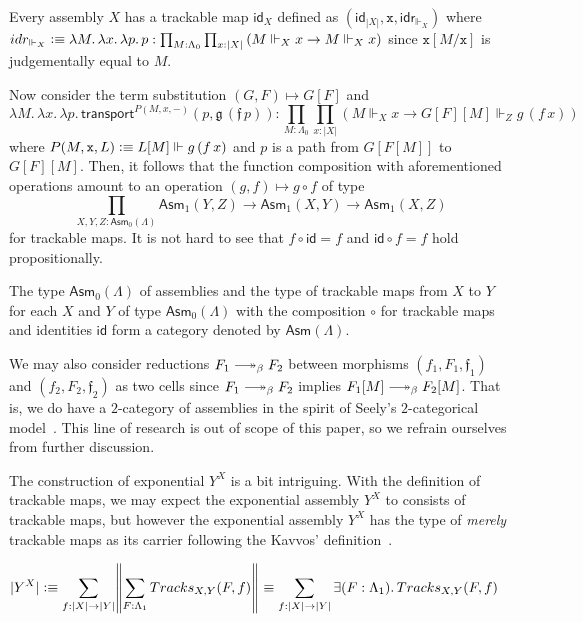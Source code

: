 \documentclass[a4paper,UKenglish,numberwithinsect,cleveref,thm-restate]{lipics-v2021}
\newcommand{\trunc}[2]{\mathopen{}\left\Vert #2\right\Vert_{#1}\mathclose{}}
\newcommand{\brck}[1]{\trunc{}{#1}}
\newcommand{\Asm}{\mathsf{Asm}}
\newcommand{\defeq}{\vcentcolon\equiv}
\newcommand{\blank}{{-}}
\newcommand{\id}{\mathsf{id}}
\DeclareRobustCommand\longtwoheadrightarrow{\relbar\joinrel\twoheadrightarrow}
\newcommand{\reduce}{\longtwoheadrightarrow_{\beta}}
\theoremstyle{plain}
\begin{document}
\begin{example}
  Every assembly $X$ has a trackable map $\id_X$ defined as $(\mathsf{id}_{|X|}, \mathtt{x}, \mathsf{idr}_{\Vdash_X})$
  where
    $\mathsf{idr}_{\Vdash_X} \defeq \lambda M.\,\lambda x.\,\lambda p.\, p
    : \prod_{M : \Lambda_0} \prod_{x : |X|} \left( M \Vdash_X x \to M  \Vdash_X x  \right)$
  since $\mathtt{x}[M/\mathtt{x}]$ is judgementally equal to $M$.
\end{example}
Now consider the term substitution $(G, F)
\mapsto G [ F ]$ and
\[
  \lambda M .\, \lambda x .\, \lambda p .\, \mathsf{transport}^{P(M, x, \blank)}(p, \mathfrak{g}\,(\mathfrak{f}\,p))
  : \prod_{M : \Lambda_0} \prod_{x : |X|}
  \left(M \Vdash_X x \to  G [ F ] [ M ] \Vdash_Z g\,(f\,x)\right)
\]
where $P(M, \mathtt{x}, L) \defeq L[M] \Vdash g\,(f\,x)$ and $p$ is a path from $G[F[M]]$ to $G[F] [M]$.
Then, it follows that the function composition with aforementioned operations amount to an operation $(g, f) \mapsto g \circ f$ of type
\[
  \prod_{X, Y, Z : \Asm_0(\Lambda)} \Asm_1(Y, Z) \to \Asm_1(X, Y) \to \Asm_1(X, Z)
\]
for trackable maps. It is not hard to see that $f \circ \id = f$ and $\id \circ f = f$ hold propositionally.

\begin{proposition}\label{prop:category-of-assemblies}
  The type $\Asm_0(\Lambda)$ of assemblies and the type of trackable maps from $X$ to $Y$ for each $X$ and $Y$ of type $\Asm_0(\Lambda)$ with the composition $\circ$ for trackable maps and identities $\id$ form a category denoted by $\Asm(\Lambda)$.
\end{proposition}
We may also consider reductions $F_1 \reduce F_2$ between morphisms $(f_1, F_1, \mathfrak{f}_1)$
and $(f_2, F_2, \mathfrak{f}_2)$ as two cells since $F_1 \reduce F_2$ implies $F_1[M] \reduce F_2[M]$.
That is, we do have a $2$-category of assemblies in the spirit of Seely's $2$-categorical model~\cite{Seely1987}.
This line of research is out of scope of this paper, so we refrain ourselves from further discussion. 



The construction of exponential $Y^X$ is a bit intriguing.
With the definition of trackable maps, we may expect the exponential assembly $Y^X$ to consists of trackable maps, but however the exponential assembly $Y^X$ has the type of \emph{merely} trackable maps as its carrier following the Kavvos' definition~\cite{Kavvos2017c}.  
\begin{example}
  \begin{align*}
    |Y^X| & \defeq \sum_{f : |X| \to |Y|} \brck{\sum_{F : \Lambda_1} \mathsf{Tracks}_{X, Y}(F, f) } \equiv \sum_{f : |X| \to |Y|} \exists (F : \Lambda_1).\, \mathsf{Tracks}_{X, Y}(F, f)
  \end{align*}
  
\end{example}
\end{document}
